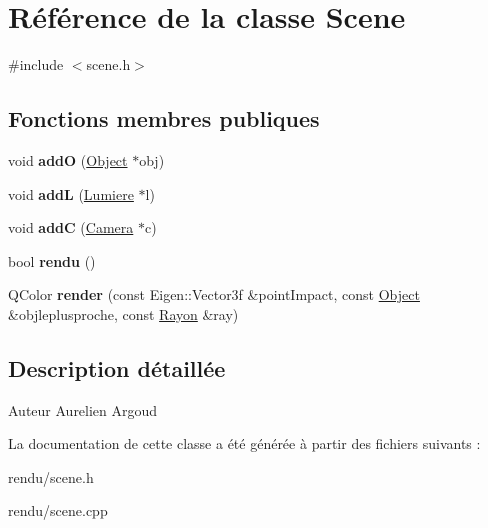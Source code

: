 \hypertarget{class_scene}{}\section{Référence de la classe Scene}
\label{class_scene}


{\ttfamily \#include $<$scene.\+h$>$}

\subsection*{Fonctions membres publiques}
\begin{DoxyCompactItemize}
\item 
\hypertarget{class_scene_a33cdf73034ae05a9ab8dd007236ccec6}{}void {\bfseries add\+O} (\hyperlink{class_object}{Object} $\ast$obj)\label{class_scene_a33cdf73034ae05a9ab8dd007236ccec6}

\item 
\hypertarget{class_scene_af58d8a996e19cd894f4f2f03b398c018}{}void {\bfseries add\+L} (\hyperlink{class_lumiere}{Lumiere} $\ast$l)\label{class_scene_af58d8a996e19cd894f4f2f03b398c018}

\item 
\hypertarget{class_scene_ac4b0bd6c6ce0e166a6e24e45b8b016cc}{}void {\bfseries add\+C} (\hyperlink{class_camera}{Camera} $\ast$c)\label{class_scene_ac4b0bd6c6ce0e166a6e24e45b8b016cc}

\item 
\hypertarget{class_scene_a5ca5f4203a0dfa959379b978214659ce}{}bool {\bfseries rendu} ()\label{class_scene_a5ca5f4203a0dfa959379b978214659ce}

\item 
\hypertarget{class_scene_a261aa1fcebafa8508cba2ce3d28b7762}{}Q\+Color {\bfseries render} (const Eigen\+::\+Vector3f \&point\+Impact, const \hyperlink{class_object}{Object} \&objleplusproche, const \hyperlink{class_rayon}{Rayon} \&ray)\label{class_scene_a261aa1fcebafa8508cba2ce3d28b7762}

\end{DoxyCompactItemize}


\subsection{Description détaillée}
\begin{DoxyAuthor}{Auteur}
Aurelien Argoud 
\end{DoxyAuthor}


La documentation de cette classe a été générée à partir des fichiers suivants \+:\begin{DoxyCompactItemize}
\item 
rendu/scene.\+h\item 
rendu/scene.\+cpp\end{DoxyCompactItemize}
